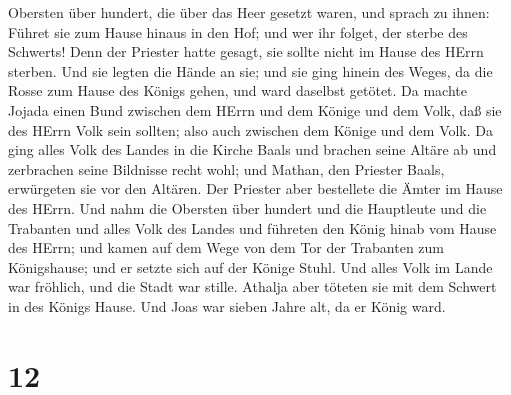 Obersten über hundert, die über das Heer gesetzt waren, und sprach zu
ihnen: Führet sie zum Hause hinaus in den Hof; und wer ihr folget, der
sterbe des Schwerts! Denn der Priester hatte gesagt, sie sollte nicht im
Hause des HErrn sterben.  Und sie legten die Hände an sie;
und sie ging hinein des Weges, da die Rosse zum Hause des Königs gehen,
und ward daselbst getötet.  Da machte Jojada einen Bund
zwischen dem HErrn und dem Könige und dem Volk, daß sie des HErrn Volk
sein sollten; also auch zwischen dem Könige und dem Volk. 
Da ging alles Volk des Landes in die Kirche Baals und brachen seine
Altäre ab und zerbrachen seine Bildnisse recht wohl; und Mathan, den
Priester Baals, erwürgeten sie vor den Altären. Der Priester aber
bestellete die Ämter im Hause des HErrn.  Und nahm die
Obersten über hundert und die Hauptleute und die Trabanten und alles
Volk des Landes und führeten den König hinab vom Hause des HErrn; und
kamen auf dem Wege von dem Tor der Trabanten zum Königshause; und er
setzte sich auf der Könige Stuhl.  Und alles Volk im Lande
war fröhlich, und die Stadt war stille. Athalja aber töteten sie mit dem
Schwert in des Königs Hause.  Und Joas war sieben Jahre
alt, da er König ward.

\hypertarget{section-11}{%
\section{12}\label{section-11}}

